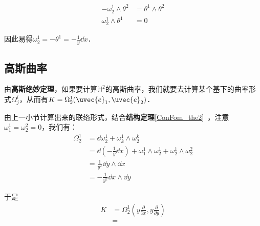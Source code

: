 \begin{equation}
\begin{aligned}
-\omega^1_2\wedge\theta^2&=\theta^1\wedge\theta^2\\
\omega^1_2\wedge\theta^1&=0
\end{aligned}
\end{equation}

因此易得$\omega^1_2=-\theta^1=-\frac{1}{y}\dd x$．



\subsection{高斯曲率}


由\textbf{高斯绝妙定理}，如果要计算$\mathbb{H}^2$的高斯曲率，我们就要去计算某个基下的曲率形式$\Omega^i_j$，从而有$K=\Omega^1_2(\uvec{e}_1, \uvec{e}_2)$．

由上一小节计算出来的联络形式，结合\textbf{结构定理}\autoref{ConFom_the2}~，注意$\omega^1_1=\omega^2_2=0$，我们有：
\begin{equation}
\begin{aligned}
\Omega^1_2&=\dd \omega^1_2+\omega^1_k\wedge\omega^k_2\\
&=\dd(-\frac{1}{y}\dd x)+\omega^1_1\wedge\omega^1_2+\omega^1_2\wedge\omega^2_2\\
&=\frac{1}{y^2}\dd y\wedge\dd x\\
&=-\frac{1}{y^2}\dd x\wedge \dd y
\end{aligned}
\end{equation}

于是
\begin{equation}
\begin{aligned}
K&=\Omega^1_2(y\frac{\partial}{\partial x}, y\frac{\partial}{\partial y})\\
&=
\end{aligned}
\end{equation}





